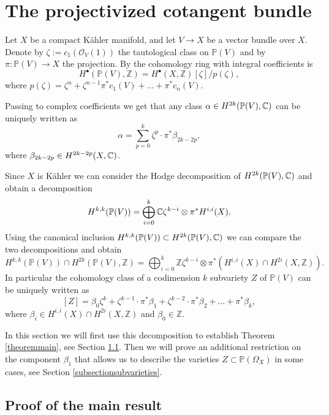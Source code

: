 \documentclass[11pt]{article}
\let\mathcal\mathscr
\newcommand{\sbullet}{{\scriptscriptstyle\bullet}}
\theoremstyle{plain}
\theoremstyle{definition}
\newcommand{\Z}{\ensuremath{\mathbb{Z}}}
\newcommand{\PP}{\ensuremath{\mathbb{P}}}
\newcommand{\holom}[3]{\ensuremath{#1:#2\to #3}}
\newcommand\sO{{\mathcal O}}
\begin{document}
\section{The projectivized cotangent bundle} \label{sectionsubvarieties}

Let $X$ be a compact Kähler manifold,
and let $V \to X$ be a vector bundle over $X$. Denote by $\zeta:=c_1(\sO_V(1))$ the tautological
class on $\PP(V)$ and by $\holom{\pi}{\PP(V)}{X}$ the projection.
By \cite[Chap.\,2]{Kob87} the cohomology ring with integral coefficients is
\[
H^{\sbullet}(\PP(V),\Z)=H^{\sbullet}(X, \Z )[\zeta]/p(\zeta),
\]
where $p(\zeta)=\zeta^n+\zeta^{n-1} \pi^* c_1(V)+ \ldots + \pi^* c_{n}(V)$. 

Passing to complex coefficients we get that any class $\alpha \in H^{2k}(\PP(V),\C) $ can be uniquely written as
\[
\alpha= \sum_{p=0}^{k} \zeta^p \cdot \pi^* \beta_{2k-2p},
\]
where $\beta_{2k-2p} \in H^{2k-2p}(X, \mathbb{C})$.

Since $X$ is Kähler we can consider the Hodge decomposition
of $H^{2k}(\PP(V),\C)$
and obtain a decomposition
\[
H^{k,k}(\PP(V))=\bigoplus_{i=0}^k \C \zeta^{k-i} \otimes \pi^* H^{i,i}(X).
\]
Using the canonical inclusion $H^{k,k}(\PP(V)) \subset H^{2k}(\PP(V),\C)$
we can compare the two decompositions and obtain
\begin{equation} \label{decomposecohomology}
H^{k,k}(\PP(V))\cap H^{2k}(\PP(V),\Z)=\bigoplus_{i=0}^k \Z \zeta^{k-i} \otimes \pi^* (H^{i,i}(X)\cap H^{2i}(X,\Z ) ).
\end{equation}
In particular the cohomology class of a codimension $k$ subvariety $Z$ of $\PP(V)$ can be uniquely written as
\begin{equation} \label{decompose}
[Z]=\beta_0 \zeta^k + \zeta^{k-1}\cdot \pi^* \beta_1 + \zeta^{k-2}\cdot \pi^* \beta_2 + \ldots + \pi^* \beta_k,
\end{equation}
where $\beta_i\in H^{i,i}(X)\cap H^{2i}(X,\Z )$ and $\beta_0 \in \Z$.

In this section we will first use this decomposition to establish Theorem \ref{theoremmain}, see Section \ref{subsectionproofmain}.
Then we will prove an additional restriction on the component $\beta_1$ that allows us
to describe the varieties $Z \subset \PP(\Omega_X)$ in some cases, see Section \ref{subsectionsubvarieties}.

\subsection{Proof of the main result} \label{subsectionproofmain}
\end{document}
